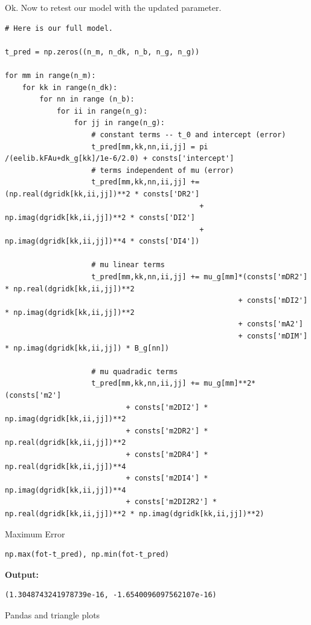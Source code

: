 \documentclass{article}
\begin{document}
Ok. Now to retest our model with the updated parameter.

\begin{lstlisting}
# Here is our full model.

t_pred = np.zeros((n_m, n_dk, n_b, n_g, n_g))

for mm in range(n_m): 
    for kk in range(n_dk):
        for nn in range (n_b):
            for ii in range(n_g):
                for jj in range(n_g):
                    # constant terms -- t_0 and intercept (error)
                    t_pred[mm,kk,nn,ii,jj] = pi /(eelib.kFAu+dk_g[kk]/1e-6/2.0) + consts['intercept']
                    # terms independent of mu (error)
                    t_pred[mm,kk,nn,ii,jj] += (np.real(dgridk[kk,ii,jj])**2 * consts['DR2'] 
                                             + np.imag(dgridk[kk,ii,jj])**2 * consts['DI2'] 
                                             + np.imag(dgridk[kk,ii,jj])**4 * consts['DI4'])

                    # mu linear terms
                    t_pred[mm,kk,nn,ii,jj] += mu_g[mm]*(consts['mDR2'] * np.real(dgridk[kk,ii,jj])**2
                                                      + consts['mDI2'] * np.imag(dgridk[kk,ii,jj])**2
                                                      + consts['mA2']
                                                      + consts['mDIM'] * np.imag(dgridk[kk,ii,jj]) * B_g[nn])

                    # mu quadradic terms
                    t_pred[mm,kk,nn,ii,jj] += mu_g[mm]**2*(consts['m2']
                            + consts['m2DI2'] * np.imag(dgridk[kk,ii,jj])**2
                            + consts['m2DR2'] * np.real(dgridk[kk,ii,jj])**2 
                            + consts['m2DR4'] * np.real(dgridk[kk,ii,jj])**4 
                            + consts['m2DI4'] * np.imag(dgridk[kk,ii,jj])**4
                            + consts['m2DI2R2'] * np.real(dgridk[kk,ii,jj])**2 * np.imag(dgridk[kk,ii,jj])**2)\end{lstlisting}

Maximum Error

\begin{lstlisting}
np.max(fot-t_pred), np.min(fot-t_pred)\end{lstlisting}

\textbf{Output:}\begin{verbatim}
(1.3048743241978739e-16, -1.6540096097562107e-16)
\end{verbatim}

Pandas and triangle plots
\end{document}
